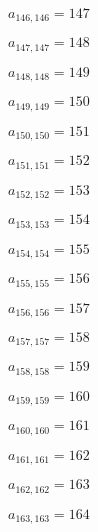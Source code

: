 \documentclass[a4paper,12pt]{article}
\begin{document}
$a _{ 146, 146 } = 147$

$a _{ 147, 147 } = 148$

$a _{ 148, 148 } = 149$

$a _{ 149, 149 } = 150$

$a _{ 150, 150 } = 151$

$a _{ 151, 151 } = 152$

$a _{ 152, 152 } = 153$

$a _{ 153, 153 } = 154$

$a _{ 154, 154 } = 155$

$a _{ 155, 155 } = 156$

$a _{ 156, 156 } = 157$

$a _{ 157, 157 } = 158$

$a _{ 158, 158 } = 159$

$a _{ 159, 159 } = 160$

$a _{ 160, 160 } = 161$

$a _{ 161, 161 } = 162$

$a _{ 162, 162 } = 163$

$a _{ 163, 163 } = 164$
\end{document}
